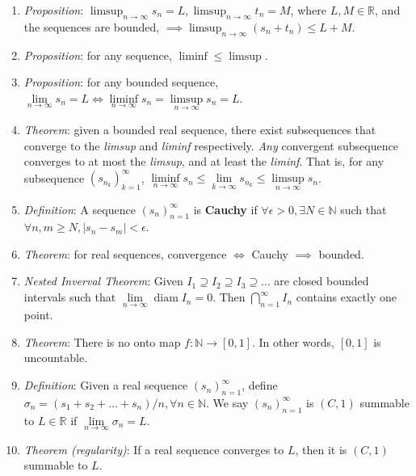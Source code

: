 \documentclass[10pt]{article}
\newcommand{\seqn}[1]{(#1)^\infty_{n=1}}
\newcommand{\seqk}[1]{(#1)^\infty_{k=1}}
\newcommand{\real}{\mathbb{R}}
\newcommand{\nat}{\mathbb{N}}
\newcommand{\ntoinf}{\limits_{n\to\infty}}
\newcommand{\ktoinf}{\limits_{k\to\infty}}
\newcommand{\limn}[1]{\lim\ntoinf #1}
\newcommand{\limk}[1]{\lim\ktoinf #1}
\DeclareMathOperator{\diam}{diam}
\begin{document}
\begin{multicols*}{3}
\begin{enumerate}
		\item \emph{Proposition}:
		      $\limsup_{n\to\infty}s_n=L,\limsup_{n\to\infty}t_n=M$,
		      where $L,M\in\real$, and the sequences are bounded,
		      $\implies\limsup_{n\to\infty}(s_n+t_n)\leq L+M$.
		\item \emph{Proposition}: for any sequence, $\liminf\leq\limsup$.
		\item \emph{Proposition}: for any bounded sequence, $\limn s_n=L\iff
			      \liminf\ntoinf s_n=\limsup\ntoinf s_n=L$.
		\item \emph{Theorem}: given a bounded real sequence, there exist
		      subsequences that converge to the \emph{limsup} and \emph{liminf}
		      respectively. \emph{Any} convergent subsequence converges to at most
		      the \emph{limsup}, and at least the \emph{liminf}. That is, for any
		      subsequence $\seqk{s_{n_k}}$,
		      $\liminf\ntoinf s_n\leq\limk{s_{n_k}}\leq\limsup\ntoinf s_n$.
		\item \emph{Definition}: A sequence $\seqn{s_n}$ is \textbf{Cauchy} if
		      $\forall\epsilon>0,\exists N\in\nat$ such that
		      $\forall n,m\geq N,|s_n-s_m|<\epsilon$.
		\item \emph{Theorem}: for real sequences, convergence $\iff$ Cauchy
		      $\implies$ bounded.
		\item \emph{Nested Inverval Theorem}: Given $I_1\supseteq I_2\supseteq
			      I_3\supseteq\dots$ are closed bounded intervals such that
		      $\limn\diam I_n=0$. Then $\bigcap\limits_{n=1}^\infty I_n$ contains
		      exactly one point.
		\item \emph{Theorem}: There is no onto map $f:\nat\to[0,1]$. In
		      other words, $[0,1]$ is uncountable.
		\item \emph{Definition}: Given a real sequence $\seqn{s_n}$, define
		      $\sigma_n=(s_1+s_2+\dots+s_n)/n,\forall n\in\nat$. We say
		      $\seqn{s_n}$ is $(C,1)$ summable to $L\in\real$ if $\limn\sigma_n=L$.
		\item \emph{Theorem (regularity)}: If a real sequence converges to $L$,
		      then it is $(C,1)$ summable to $L$.
	\end{enumerate}


\end{multicols*}
\end{document}
